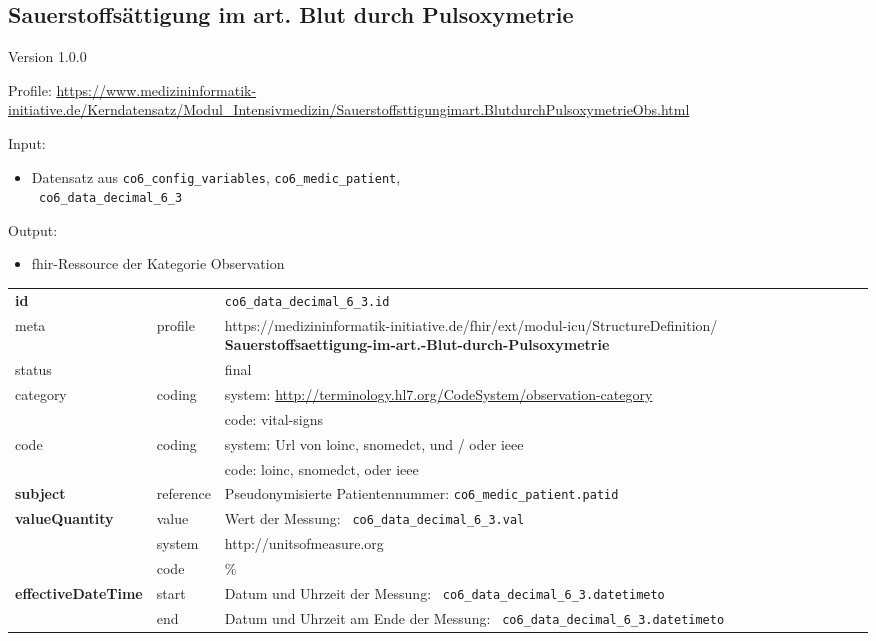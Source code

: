 \subsection{Sauerstoffsättigung im art. Blut durch Pulsoxymetrie} 
\noindent Version 1.0.0

\noindent Profile: \url{https://www.medizininformatik-initiative.de/Kerndatensatz/Modul_Intensivmedizin/Sauerstoffsttigungimart.BlutdurchPulsoxymetrieObs.html}

\noindent Input:
\begin{itemize}
	\item Datensatz aus \texttt{co6\_config\_variables}, \texttt{co6\_medic\_patient}, \\ \texttt{
co6\_data\_decimal\_6\_3}
\end{itemize}
Output:
\begin{itemize}
        \item \ac{fhir}-Ressource der Kategorie \glqq Observation\grqq{}
\end{itemize}
\begin{longtable}{|l|l|p{7.5cm}|}
        \hline
        \rowcolor{lightgray} \multicolumn{3}{|l|}{Data Mapping (inhaltlich)} \\ \hline
        \textbf{id} &  & \texttt{co6\_data\_decimal\_6\_3.id} \\ \hline
	meta & profile & https://medizininformatik-initiative.de/fhir/ext/modul-icu/StructureDefinition/\textbf{
Sauerstoffsaettigung-im-art.-Blut-durch-Pulsoxymetrie} \\ \hline 
	status &  & final   \\ \hline 
	category & coding & system: \url{http://terminology.hl7.org/CodeSystem/observation-category} \\
\cline{3-3}
	& & code: vital-signs \\ \hline
	code & coding & system: Url von \ac{loinc}, \ac{snomedct}, und / oder \ac{ieee} \\ 
	\cline{3-3} 
	 &  & code: \ac{loinc}, \ac{snomedct}, oder \ac{ieee} \\ \hline
	 \textbf{subject}  & reference & Pseudonymisierte Patientennummer: \texttt{co6\_medic\_patient.patid} \\ \hline
	 \textbf{valueQuantity}  & value & Wert der Messung: \texttt{
co6\_data\_decimal\_6\_3.val} \\
        \cline{2-3}
         & system & http://unitsofmeasure.org \\
         \cline{2-3}
         & code & \% \\ \hline
     \textbf{effectiveDateTime}  & start & Datum und Uhrzeit der Messung: \texttt{
co6\_data\_decimal\_6\_3.datetimeto} \\
    \cline{2-3}
     & end & Datum und Uhrzeit am Ende der Messung: \texttt{
co6\_data\_decimal\_6\_3.datetimeto} \\ \hline
\end{longtable}


